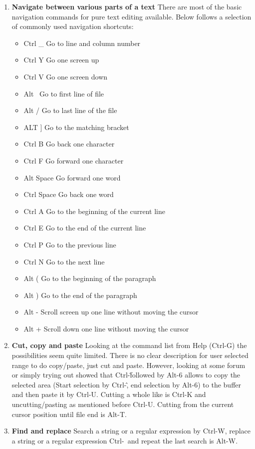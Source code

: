 \documentclass[a4paper,11pt,twoside]{article}
\begin{document}
\begin{enumerate}
\item \textbf{Navigate between various parts of a text} There are most of the basic navigation commands for pure text editing available. Below follows a selection of commonly used navigation shortcuts:
  \begin{itemize}
    \item Ctrl \_ Go to line and column number
    \item Ctrl Y Go one screen up
    \item Ctrl V Go one screen down
    \item Alt \ Go to first line of file
    \item Alt / Go to last line of the file
    \item ALT ] Go to the matching bracket
    \item Ctrl B Go back one character
    \item Ctrl F Go forward one character
    \item Alt Space Go forward one word
    \item Ctrl Space Go back one word
    \item Ctrl A Go to the beginning of the current line
    \item Ctrl E Go to the end of the current line
    \item Ctrl P Go to the previous line
    \item Ctrl N Go to the next line
    \item Alt ( Go to the beginning of the paragraph
    \item Alt ) Go to the end of the paragraph
    \item Alt - Scroll screen up one line without moving the cursor
    \item Alt + Scroll down one line without moving the cursor
\end{itemize}
  

  
\item \textbf{Cut, copy and paste} Looking at the command list from Help (Ctrl-G) the possibilities seem quite limited. There is no clear description for user selected range to do copy/paste, just cut and paste. However, looking at some forum or simply trying out showed that Ctrl-\^ followed by Alt-6 allows to copy the selected area (Start selection by Ctrl-\^, end selection by Alt-6) to the buffer and then paste it by Ctrl-U. Cutting a whole like is Ctrl-K and uncutting/pasting as mentioned before Ctrl-U. Cutting from the current cursor position until file end is Alt-T.
    
\item \textbf{Find and replace}
Search a string or a regular expression by Ctrl-W, replace a string or a regular expression Ctrl-\ and repeat the last search is Alt-W.

\end{enumerate}
\end{document}

